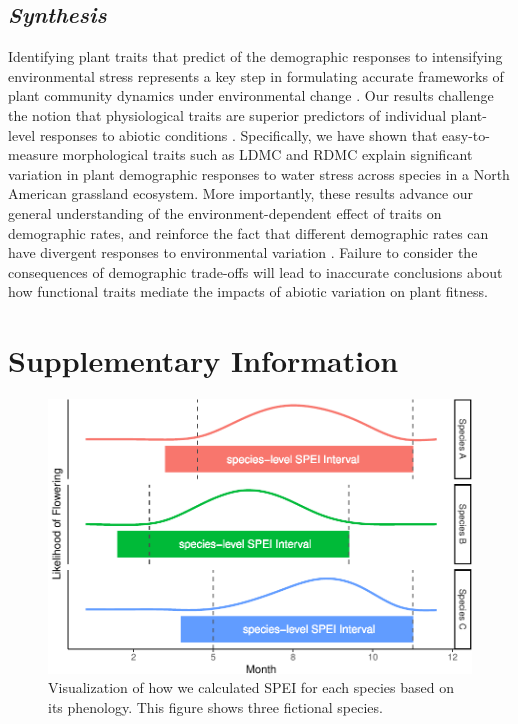 \documentclass[12pt, letterpaper]{article}
\begin{document}
\subsection{\textit{Synthesis}} Identifying plant traits that predict of the demographic responses to intensifying environmental stress represents a key step in formulating accurate frameworks of plant community dynamics under environmental change \citep{Laughlin2020TheFitness}. Our results challenge the notion that physiological traits are superior predictors of individual plant-level responses to abiotic conditions \citep{Volaire2018}. Specifically, we have shown that easy-to-measure morphological traits such as LDMC and RDMC explain significant variation in plant demographic responses to water stress across species in a North American grassland ecosystem. More importantly, these results advance our general understanding of the environment-dependent effect of traits on demographic rates, and reinforce the fact that different demographic rates can have divergent responses to environmental variation \citep{Laughlin2020TheFitness}. Failure to consider the consequences of demographic trade-offs will lead to inaccurate conclusions about how functional traits mediate the impacts of abiotic variation on plant fitness. 





\renewcommand{\thetable}{S\arabic{table}} %
\setcounter{table}{0} %
\renewcommand{\thefigure}{S\arabic{figure}} %
\setcounter{figure}{0} %


\section{Supplementary Information}

\begin{figure}
\includegraphics[width=.8\textwidth]{uniqueSPEIfig-1.pdf}
\caption{\small{
Visualization of how we calculated SPEI for each species based on its phenology. This figure shows three fictional species.
}}
\label{fig:SPEI_fig}
\end{figure}
\end{document}
